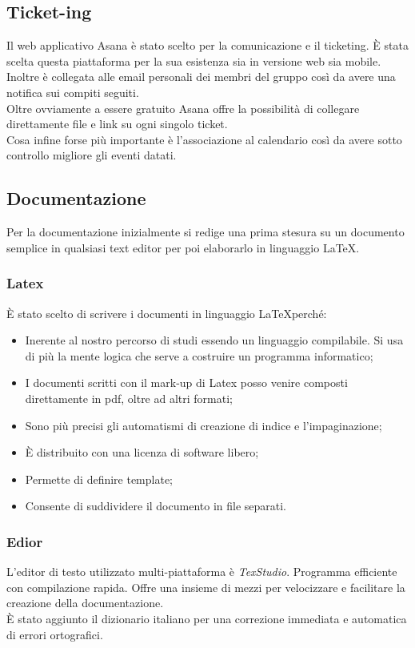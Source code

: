 \documentclass[12pt,a4paper,titlepage]{article}
\begin{document}
\subsection{Ticket-ing}
Il web applicativo Asana è stato scelto per la comunicazione e il ticketing. È stata scelta questa piattaforma per la sua esistenza sia in versione web sia mobile.
Inoltre è collegata alle email personali dei membri del gruppo così da avere una notifica sui compiti seguiti.\\
Oltre ovviamente a essere gratuito Asana offre la possibilità di collegare direttamente file e link su ogni singolo ticket. \\
Cosa infine forse più importante è l'associazione al calendario così da avere sotto controllo migliore gli eventi datati.
\subsection{Documentazione}
Per la documentazione inizialmente si redige una prima stesura su un documento semplice in qualsiasi text editor per poi elaborarlo in linguaggio \LaTeX.
\subsubsection{Latex}
È stato scelto di scrivere i documenti in linguaggio \LaTeX perché:
\begin{itemize}
	\item Inerente al nostro percorso di studi essendo un linguaggio compilabile. Si usa di più la mente logica che serve a costruire un programma informatico;
	\item I documenti scritti con il mark-up di Latex posso venire composti direttamente in pdf, oltre ad altri formati;
	\item Sono più precisi gli automatismi di creazione di indice e l'impaginazione;
	\item È distribuito con una licenza di software libero;
	\item Permette di definire template;
	\item Consente di suddividere il documento in file separati.
\end{itemize} 
\subsubsection{Edior}
L'editor di testo utilizzato multi-piattaforma è \textit{TexStudio}. Programma efficiente con compilazione rapida. Offre una insieme di mezzi per velocizzare e facilitare la creazione della documentazione.\\
È stato aggiunto il dizionario italiano per una correzione immediata e automatica di errori ortografici.
\end{document}
